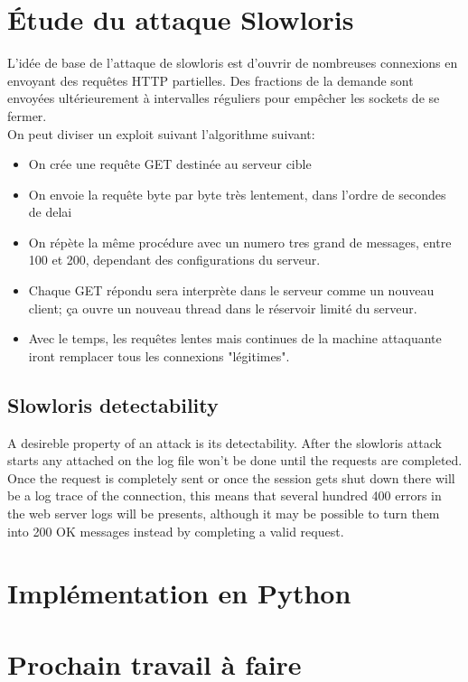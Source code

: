 \documentclass{article}
\begin{document}
\section{Étude du attaque Slowloris}
L'idée de base de l'attaque de slowloris est d'ouvrir de nombreuses connexions en envoyant des requêtes HTTP partielles. Des fractions de la demande sont envoyées ultérieurement à intervalles réguliers pour empêcher les sockets de se fermer. \\
On peut diviser un exploit suivant l'algorithme suivant: \\
\begin{itemize}
	\item On crée une requête GET destinée au serveur cible
	\item On envoie la requête byte par byte très lentement, dans l'ordre de secondes de delai
	\item On répète la même procédure avec un numero tres grand de messages, entre 100 et 200, dependant des configurations du serveur.
	\item Chaque GET répondu sera interprète dans le serveur comme un nouveau client; ça ouvre un nouveau thread dans le réservoir limité du serveur.
	\item Avec le temps, les requêtes lentes mais continues de la machine attaquante iront remplacer tous les connexions "légitimes".
\end{itemize}

\subsection{Slowloris detectability}
A desireble property of an attack is its detectability. After the slowloris attack starts any attached on the log file won't be done until the requests are completed. Once the request is completely sent or once the session gets shut down there will be a log trace of the connection, this means that several hundred 400 errors in the web server logs will be presents,  although it may be possible to turn them into 200 OK messages instead by completing a valid request.

\section{Implémentation en Python}

\section{Prochain travail à faire}
\end{document}
